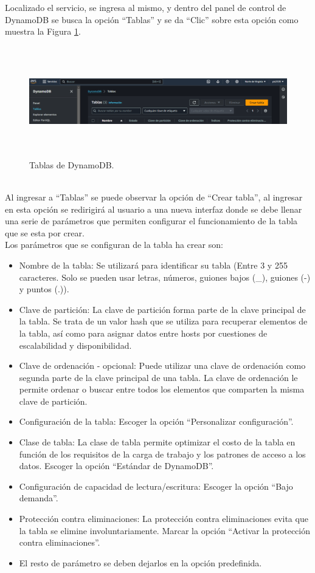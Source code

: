 \documentclass[a4paper,10pt, oneside, titlepage]{article}
\begin{document}
	\indent Localizado el servicio, se ingresa al mismo, y dentro del panel de control de DynamoDB se busca la opción ``Tablas'' y se da ``Clic'' sobre esta opción como muestra la Figura \ref{Tablas_DynamoDB}.
	\begin{figure}[!h]
		\centering
		\includegraphics[width = 1\linewidth, height = 4.8cm]{Tablas_DynamoDB.png}
		\caption{Tablas de DynamoDB.}
		\label{Tablas_DynamoDB}
	\end{figure} \\
	\indent Al ingresar a ``Tablas'' se puede observar la opción de ``Crear tabla'', al ingresar en esta opción se redirigirá al usuario a una nueva interfaz donde se debe llenar una serie de parámetros que permiten configurar el funcionamiento de la tabla que se esta por crear. \\\newline
	\indent Los parámetros que se configuran de la tabla ha crear son:
	\begin{itemize}
		\item Nombre de la tabla: Se utilizará para identificar su tabla (Entre 3 y 255 caracteres. Solo se pueden usar letras, números, guiones bajos (\_), guiones (-) y puntos (.)).
		\item Clave de partición: La clave de partición forma parte de la clave principal de la tabla. Se trata de un valor hash que se utiliza para recuperar elementos de la tabla, así como para asignar datos entre hosts por cuestiones de escalabilidad y disponibilidad.
		\item Clave de ordenación - opcional: Puede utilizar una clave de ordenación como segunda parte de la clave principal de una tabla. La clave de ordenación le permite ordenar o buscar entre todos los elementos que comparten la misma clave de partición.
		\item Configuración de la tabla: Escoger la opción ``Personalizar configuración''.
		\item Clase de tabla: La clase de tabla permite optimizar el costo de la tabla en función de los requisitos de la carga de trabajo y los patrones de acceso a los datos. Escoger la opción ``Estándar de DynamoDB''.
		\item Configuración de capacidad de lectura/escritura: Escoger la opción ``Bajo demanda''.
		\item Protección contra eliminaciones: La protección contra eliminaciones evita que la tabla se elimine involuntariamente. Marcar la opción ``Activar la protección contra eliminaciones''.
		\item El resto de parámetro se deben dejarlos en la opción predefinida.
	\end{itemize}
\end{document}
